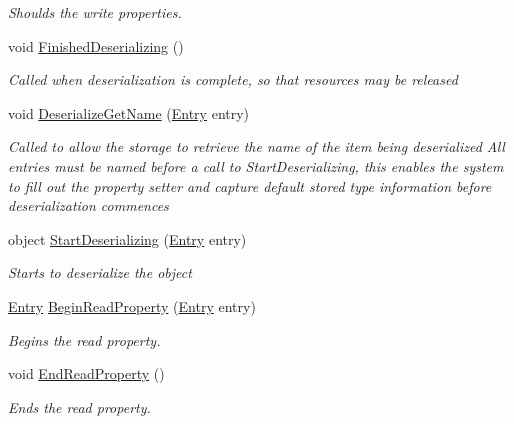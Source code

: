 \begin{DoxyCompactItemize}
\begin{DoxyCompactList}\small\item\em Shoulds the write properties. \end{DoxyCompactList}\item 
void \hyperlink{class_serialization_1_1_binary_serializer_af70f7fb26c0b41d0f1126634df2de03a}{Finished\+Deserializing} ()
\begin{DoxyCompactList}\small\item\em Called when deserialization is complete, so that resources may be released \end{DoxyCompactList}\item 
void \hyperlink{class_serialization_1_1_binary_serializer_ac02802eda1961199b7e91adce7c33de7}{Deserialize\+Get\+Name} (\hyperlink{class_serialization_1_1_entry}{Entry} entry)
\begin{DoxyCompactList}\small\item\em Called to allow the storage to retrieve the name of the item being deserialized All entries must be named before a call to Start\+Deserializing, this enables the system to fill out the property setter and capture default stored type information before deserialization commences \end{DoxyCompactList}\item 
object \hyperlink{class_serialization_1_1_binary_serializer_a9b376977bd19d9bfef1fce28e110220a}{Start\+Deserializing} (\hyperlink{class_serialization_1_1_entry}{Entry} entry)
\begin{DoxyCompactList}\small\item\em Starts to deserialize the object \end{DoxyCompactList}\item 
\hyperlink{class_serialization_1_1_entry}{Entry} \hyperlink{class_serialization_1_1_binary_serializer_a0c77f70b9259bc13d96eafe34b092f3b}{Begin\+Read\+Property} (\hyperlink{class_serialization_1_1_entry}{Entry} entry)
\begin{DoxyCompactList}\small\item\em Begins the read property. \end{DoxyCompactList}\item 
void \hyperlink{class_serialization_1_1_binary_serializer_a0b50b703f7b33e2b60421611a3757716}{End\+Read\+Property} ()
\begin{DoxyCompactList}\small\item\em Ends the read property. \end{DoxyCompactList}\item 

\end{DoxyCompactItemize}
